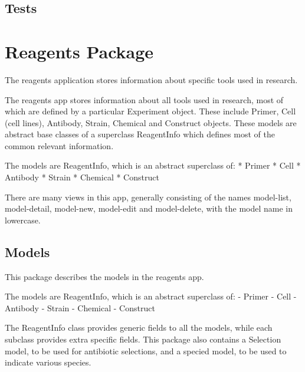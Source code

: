 \documentclass[letterpaper,10pt,english]{sphinxmanual}
\begin{document}

\begin{fulllineitems}
\label{api:experimentdb.proteins.urls.restricted_object_list}
\end{fulllineitems}



\subsection{Tests}
\label{api:id17}

\section{Reagents Package}
\label{api:module-experimentdb.reagents}\label{api:reagents-package}
The reagents application stores information about specific tools used in research.


The reagents app stores information about all tools used in research, most of which are defined by a particular Experiment object.  These include Primer, Cell (cell lines), Antibody, Strain, Chemical and Construct objects.  These models are abstract base classes of a superclass ReagentInfo which defines most of the common relevant information.


The models are ReagentInfo, which is an abstract superclass of:
* Primer
* Cell
* Antibody
* Strain
* Chemical
* Construct


There are many views in this app, generally consisting of the names model-list, model-detail, model-new, model-edit and model-delete, with the model name in lowercase.



\subsection{Models}
\label{api:id18}\label{api:module-experimentdb.reagents.models}
This package describes the models in the reagents app.


The models are ReagentInfo, which is an abstract superclass of:
- Primer
- Cell
- Antibody
- Strain
- Chemical
- Construct


The ReagentInfo class provides generic fields to all the models, while each subclass provides extra specific fields.
This package also contains a Selection model, to be used for antibiotic selections, and a specied model, to be used to indicate various species.
\end{document}
